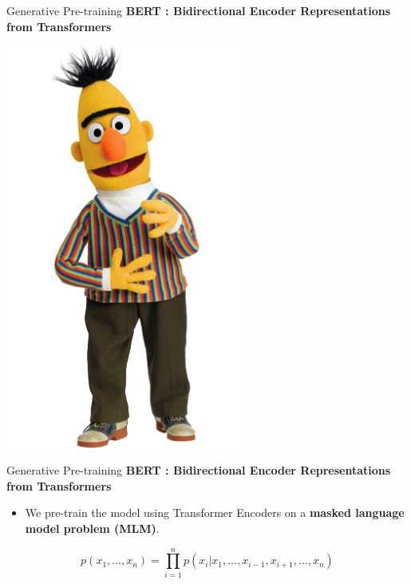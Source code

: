 \documentclass[aspectratio=169]{beamer}
\begin{document}
\begin{frame}{Generative Pre-training}
\centering
\textbf{BERT : Bidirectional Encoder Representations from Transformers \cite{devlin2018bert}}

\includegraphics[width=0.6\textwidth]{figures/bert}
\end{frame}

\begin{frame}{Generative Pre-training}
\centering
\textbf{BERT : Bidirectional Encoder Representations from Transformers \cite{devlin2018bert}}

\begin{itemize}
	\item We pre-train the model using Transformer Encoders on a \textbf{masked language model problem (MLM)}.
\end{itemize}

$$
p(x_1, \dots, x_n) = \prod_{i=1}^n p(x_i | x_1, \dots, x_{i-1}, x_{i + 1}, \dots, x_n)
$$
\end{frame}
\end{document}

